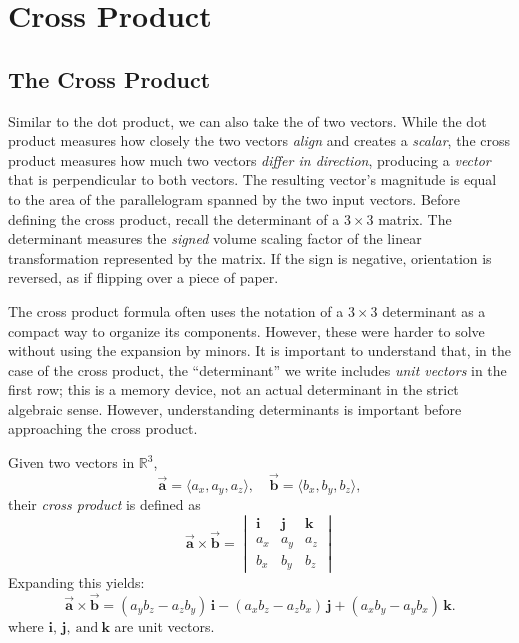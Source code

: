 \chapter{Cross Product}
\section{The Cross Product}
Similar to the dot product, we can also take the  of two vectors. 
While the dot product measures how closely the two vectors \emph{align} and creates a \emph{scalar}, the cross product measures how much two vectors \emph{differ in direction}, producing a \emph{vector} that is perpendicular to both vectors. The resulting vector's magnitude is equal to the area of the parallelogram spanned by the two input vectors.
Before defining the cross product, recall the determinant of a $3\times3$ matrix. The determinant measures the \emph{signed} volume scaling factor of the linear transformation represented by the matrix. If the sign is negative, orientation is reversed, as if flipping over a piece of paper. 

The cross product formula often uses the notation of a $3\times3$ determinant as a compact way to organize its components. However, these were harder to solve without using the expansion by minors. It is important to understand that, in the case of the cross product, the ``determinant'' we write includes \emph{unit vectors} in the first row; this is a memory device, not an actual determinant in the strict algebraic sense. However, understanding determinants is important before approaching the cross product. 
\begin{mdframed}[style=important]
Given two vectors in $\mathbb{R}^3$,
\[
\vec{\mathbf{a}} = \langle a_x, a_y, a_z \rangle, \quad
\vec{\mathbf{b}} = \langle b_x, b_y, b_z \rangle,
\]
their \emph{cross product} is defined as
\[
\vec{\mathbf{a}} \times \vec{\mathbf{b}} =
\begin{vmatrix}
\mathbf{i} & \mathbf{j} & \mathbf{k} \\
a_x & a_y & a_z \\
b_x & b_y & b_z
\end{vmatrix}
\]
Expanding this yields:
\[
\vec{\mathbf{a}} \times \vec{\mathbf{b}} =
(a_y b_z - a_z b_y)\,\mathbf{i}
- (a_x b_z - a_z b_x)\,\mathbf{j}
+ (a_x b_y - a_y b_x)\,\mathbf{k}.
\]
where $\mathbf{i},\,\mathbf{j},\ \text{and}\ \mathbf{k}$ are unit vectors.
\end{mdframed}


